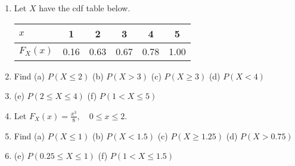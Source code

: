 \documentclass{article}
\begin{document}
\begin{itemize}
    \begin{enumerate}
        \item Let $X$ have the cdf table below.\bigskip\\
        \begin{tabular}{| l | c | c | c | c | c |}
             \hline
             $x$ & 1 & 2 & 3 & 4 & 5\\
             \hline
             $F_X(x)$ & 0.16 & 0.63 & 0.67 & 0.78 & 1.00\\
             \hline
        \end{tabular}
        \item[] Find (a) $P(X \le 2)$ \hfill (b) $P(X > 3)$ \hfill (c) $P(X \ge 3)$ \hfill (d) $P(X < 4)$\vspace{70pt}
        \item[] (e) $P(2 \le X \le 4)$ \hspace{50pt} (f) $P(1 < X \le 5)$\vspace{70pt}
        \item Let $F_X(x) = \frac{x^3}{8}, \quad 0 \le x \le 2$.
        \item[] Find (a) $P(X \le 1)$ \hfill (b) $P(X < 1.5)$ \hfill (c) $P(X \ge1.25)$ \hfill (d) $P(X > 0.75)$\vspace{70pt}
        \item[] (e) $P(0.25 \le X \le 1)$ \hspace{50pt} (f) $P(1 < X \le 1.5)$\vspace{70pt}
    \end{enumerate}
\end{itemize}\bigskip
\end{document}
